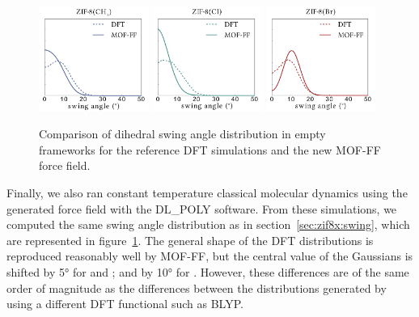\documentclass[thesis]{subfiles}
\begin{document}
\begin{figure}[ht]
    \centering
    \includegraphics[width=0.32\textwidth]{figures/images/mof-ff-dihedrals-CH3}
    \includegraphics[width=0.32\textwidth]{figures/images/mof-ff-dihedrals-Cl}
    \includegraphics[width=0.32\textwidth]{figures/images/mof-ff-dihedrals-Br}
    \caption{Comparison of dihedral swing angle distribution in empty frameworks
    for the reference DFT simulations and the new MOF-FF force field.}
    \label{fig:fig:mof-ff:swing}
\end{figure}

Finally, we also ran constant temperature classical molecular dynamics using the
generated force field with the DL\_POLY software. From these simulations, we
computed the same swing angle distribution as in section~\ref{sec:zif8x:swing},
which are represented in figure~\ref{fig:fig:mof-ff:swing}. The general shape of
the DFT distributions is reproduced reasonably well by MOF-FF, but the central
value of the Gaussians is shifted by 5° for \ZIFCl and \ZIFBr; and by 10° for
. However, these differences are of the same order of magnitude as the
differences between the distributions generated by using a different DFT
functional such as BLYP\cite{Coudert2017}.

\OnlyInSubfile{\printbibliography}
\end{document}
